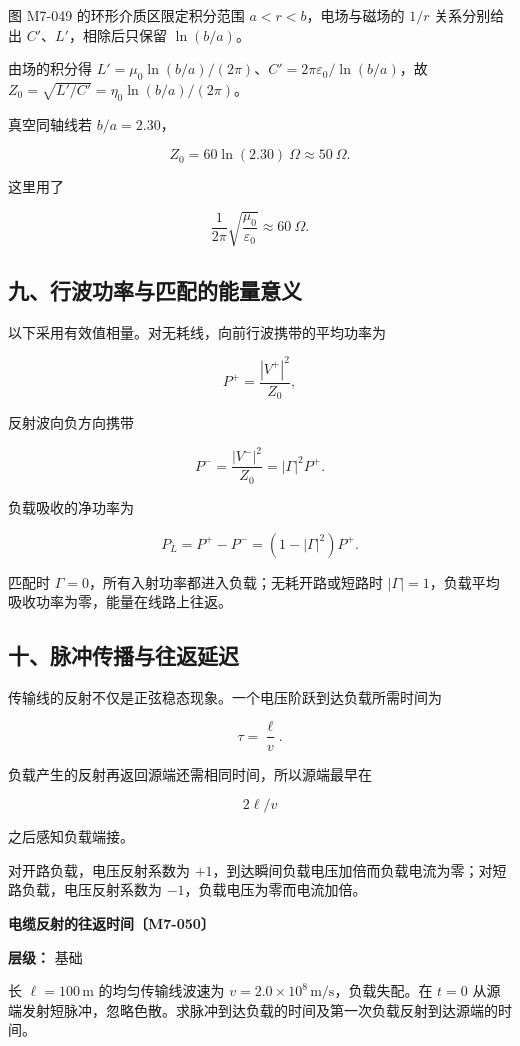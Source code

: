 图 M7-049 的环形介质区限定积分范围 \(a<r<b\)，电场与磁场的 \(1/r\)
关系分别给出 \(C'\)、\(L'\)，相除后只保留 \(\ln(b/a)\)。

由场的积分得
\(L'=\mu_0\ln(b/a)/(2\pi)\)、\(C'=2\pi\varepsilon_0/\ln(b/a)\)，故
\(Z_0=\sqrt{L'/C'}=\eta_0\ln(b/a)/(2\pi)\)。

真空同轴线若 \(b/a=2.30\)，

\[
Z_0=60\ln(2.30)\ \Omega\approx50\ \Omega.
\]

这里用了

\[
\frac1{2\pi}\sqrt{\frac{\mu_0}{\varepsilon_0}}\approx60\ \Omega.
\]

\subsection{九、行波功率与匹配的能量意义}\label{m7:ux4e5dux884cux6ce2ux529fux7387ux4e0eux5339ux914dux7684ux80fdux91cfux610fux4e49}

以下采用有效值相量。对无耗线，向前行波携带的平均功率为

\[
\boxed{
P^+=\frac{|V^+|^2}{Z_0}
},
\]

反射波向负方向携带

\[
\boxed{
P^-=\frac{|V^-|^2}{Z_0}
=|\Gamma|^2P^+
}.
\]

负载吸收的净功率为

\[
\boxed{
P_L=P^+-P^-
=(1-|\Gamma|^2)P^+
}.
\]

匹配时 \(\Gamma=0\)，所有入射功率都进入负载；无耗开路或短路时
\(|\Gamma|=1\)，负载平均吸收功率为零，能量在线路上往返。

\subsection{十、脉冲传播与往返延迟}\label{m7:ux5341ux8109ux51b2ux4f20ux64adux4e0eux5f80ux8fd4ux5ef6ux8fdf}

传输线的反射不仅是正弦稳态现象。一个电压阶跃到达负载所需时间为

\[
\boxed{\tau=\frac{\ell}{v}}.
\]

负载产生的反射再返回源端还需相同时间，所以源端最早在

\[
\boxed{2\ell/v}
\]

之后感知负载端接。

对开路负载，电压反射系数为
\(+1\)，到达瞬间负载电压加倍而负载电流为零；对短路负载，电压反射系数为
\(-1\)，负载电压为零而电流加倍。

\par{}
\noindent\begin{minipage}{\linewidth}

\textbf{电缆反射的往返时间〔M7-050〕}

\textbf{层级：} 基础

长 \(\ell=100\,\mathrm m\) 的均匀传输线波速为
\(v=2.0\times10^8\,\mathrm{m/s}\)，负载失配。在 \(t=0\)
从源端发射短脉冲，忽略色散。求脉冲到达负载的时间及第一次负载反射到达源端的时间。

\end{minipage}\par


